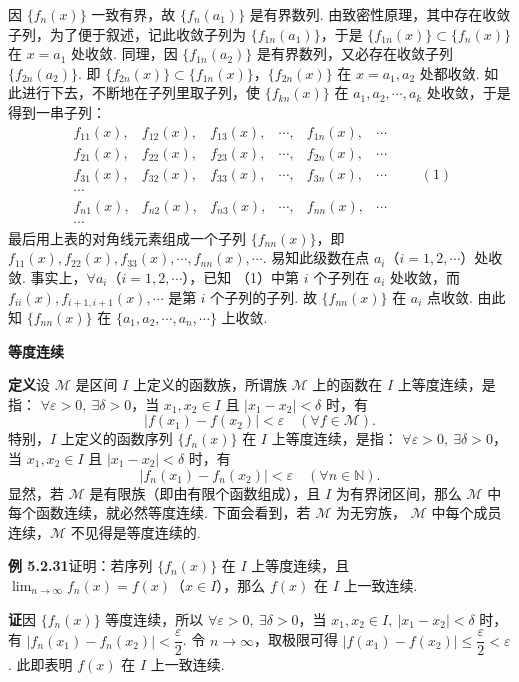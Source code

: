 \documentclass[UTF8,12pt,a4paper,fontset=fandol]{ctexart}
\begin{document}
因 $\{f_n(x)\}$ 一致有界，故 $\{f_n(a_1)\}$ 是有界数列. 由致密性原理，其中存在收敛子列，为了便于叙述，记此收敛子列为
$\{f_{1n}(a_1)\}$，于是 $\{f_{1n}(x)\}\subset\{f_n(x)\}$ 在 $x=a_1$ 处收敛. 同理，因
$\{f_{1n}(a_2)\}$ 是有界数列，又必存在收敛子列 $\{f_{2n}(a_2)\}$. 即
$\{f_{2n}(x)\}\subset\{f_{1n}(x)\}$，$\{f_{2n}(x)\}$ 在 $x=a_1,a_2$ 处都收敛. 如此进行下去，不断地在子列里取子列，使
$\{f_{kn}(x)\}$ 在 $a_1,a_2,\cdots,a_k$ 处收敛，于是得到一串子列：
\[
\begin{matrix}
  f_{11}(x),& f_{12}(x),& f_{13}(x),& \cdots,& f_{1n}(x),& \cdots\\
  f_{21}(x),& f_{22}(x),& f_{23}(x),& \cdots,& f_{2n}(x),& \cdots\\
  f_{31}(x),& f_{32}(x),& f_{33}(x),& \cdots,& f_{3n}(x),& \cdots\\
  \cdots\\
  f_{n1}(x),& f_{n2}(x),& f_{n3}(x),& \cdots,& f_{nn}(x),& \cdots\\
  \cdots
\end{matrix}
\qquad(1)
\]
最后用上表的对角线元素组成一个子列 $\{f_{nn}(x)\}$，即
$f_{11}(x),f_{22}(x),f_{33}(x),\cdots,f_{nn}(x),\cdots$. 易知此级数在点
$a_i$（$i=1,2,\cdots$）处收敛. 事实上，$\forall a_i$（$i=1,2,\cdots$），已知
（1）中第 $i$ 个子列在 $a_i$ 处收敛，而
$f_{ii}(x),f_{i+1,i+1}(x),\cdots$ 是第 $i$ 个子列的子列. 故
$\{f_{nn}(x)\}$ 在 $a_i$ 点收敛. 由此知 $\{f_{nn}(x)\}$ 在
$\{a_1,a_2,\cdots,a_n,\cdots\}$ 上收敛.

\noindent\textbf{等度连续}

\noindent\textbf{定义}\quad 设 $\mathcal M$ 是区间 $I$ 上定义的函数族，所谓族 $\mathcal M$ 上的函数在 $I$ 上等度连续，是指：
$\forall\varepsilon>0,\ \exists\delta>0$，当 $x_1,x_2\in I$ 且
$|x_1-x_2|<\delta$ 时，有
\[
  |f(x_1)-f(x_2)|<\varepsilon\quad(\forall f\in\mathcal M).
\]
特别，$I$ 上定义的函数序列 $\{f_n(x)\}$ 在 $I$ 上等度连续，是指：
$\forall\varepsilon>0,\ \exists\delta>0$，当 $x_1,x_2\in I$ 且
$|x_1-x_2|<\delta$ 时，有
\[
  |f_n(x_1)-f_n(x_2)|<\varepsilon\quad(\forall n\in\mathbb N).
\]
显然，若 $\mathcal M$ 是有限族（即由有限个函数组成），且 $I$ 为有界闭区间，那么
$\mathcal M$ 中每个函数连续，就必然等度连续. 下面会看到，若 $\mathcal M$ 为无穷族，
$\mathcal M$ 中每个成员连续，$\mathcal M$ 不见得是等度连续的.

\noindent\textbf{例 5.2.31}\quad 证明：若序列 $\{f_n(x)\}$ 在 $I$ 上等度连续，且
$\displaystyle\lim_{n\to\infty}f_n(x)=f(x)$（$x\in I$），那么 $f(x)$ 在 $I$ 上一致连续.

\noindent\textbf{证}\quad 因 $\{f_n(x)\}$ 等度连续，所以 $\forall\varepsilon>0,\ \exists\delta>0$，当
$x_1,x_2\in I,\ |x_1-x_2|<\delta$ 时，有
$|f_n(x_1)-f_n(x_2)|<\dfrac\varepsilon2$. 令 $n\to\infty$，取极限可得
$|f(x_1)-f(x_2)|\le\dfrac\varepsilon2<\varepsilon$. 此即表明 $f(x)$ 在 $I$ 上一致连续.
\end{document}
